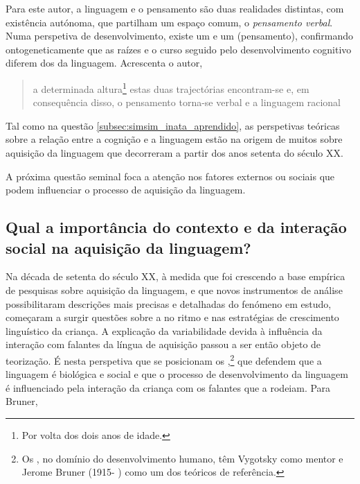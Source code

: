 \documentclass[output=paper]{LSP/langsci}
\begin{document}
Para este autor, a linguagem e o pensamento são duas realidades distintas, com existência autónoma, que partilham um espaço comum, o \emph{pensamento verbal}. Numa perspetiva de desenvolvimento, existe um  e um  (pensamento), confirmando ontogeneticamente que as raízes e o curso seguido pelo desenvolvimento cognitivo diferem dos da linguagem. Acrescenta o autor, 

\begin{quote}
a determinada altura\footnote{Por volta dos dois anos de idade.} estas duas trajectórias encontram-se e, em consequência disso, o pensamento torna-se verbal e a linguagem racional \citep[65]{vygotsky1979}
\end{quote}

Tal como na questão \ref{subsec:simsim_inata_aprendido}, as perspetivas teóricas sobre a relação entre a cognição e a linguagem estão na origem de muitos  sobre aquisição da linguagem que decorreram a partir dos anos setenta do século XX. 

A próxima questão seminal foca a atenção nos fatores externos ou sociais que podem influenciar o processo de aquisição da linguagem.

\subsection{Qual a importância do contexto e da interação social na aquisição da linguagem?}
\label{subsec:simsim_contexto}
Na década de setenta do século XX, à medida que foi crescendo a base empírica de pesquisas sobre aquisição da linguagem, e que novos instrumentos de análise possibilitaram descrições mais precisas e detalhadas do fenómeno em estudo, começaram a surgir questões sobre a  no ritmo e nas estratégias de crescimento linguístico da criança. A explicação da variabilidade devida à influência da interação com falantes da língua de aquisição passou a ser então objeto de teorização. É nesta perspetiva que se posicionam os ,\footnote{Os , no domínio do desenvolvimento humano, têm Vygotsky como mentor e Jerome Bruner (1915- )  como um dos teóricos de referência.} que defendem que a linguagem é biológica e social e que o processo de desenvolvimento da linguagem é influenciado pela interação da criança com os falantes que a rodeiam. Para Bruner,
\end{document}

